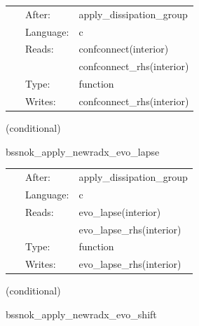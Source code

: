 \hspace{5mm}

 \begin{tabular*}{160mm}{cll} 
~ & After:  & apply\_dissipation\_group \\ 
~ & Language:  & c \\ 
~ & Reads:  & confconnect(interior) \\ 
~& ~ &confconnect\_rhs(interior)\\ 
~ & Type:  & function \\ 
~ & Writes:  & confconnect\_rhs(interior) \\ 
\end{tabular*} 


\vspace{5mm}

   (conditional) 

\hspace{5mm} bssnok\_apply\_newradx\_evo\_lapse 



\hspace{5mm}

 \begin{tabular*}{160mm}{cll} 
~ & After:  & apply\_dissipation\_group \\ 
~ & Language:  & c \\ 
~ & Reads:  & evo\_lapse(interior) \\ 
~& ~ &evo\_lapse\_rhs(interior)\\ 
~ & Type:  & function \\ 
~ & Writes:  & evo\_lapse\_rhs(interior) \\ 
\end{tabular*} 


\vspace{5mm}

   (conditional) 

\hspace{5mm} bssnok\_apply\_newradx\_evo\_shift 



\hspace{5mm}

